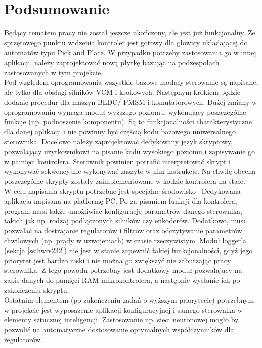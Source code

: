 \section*{Podsumowanie}

Będący tematem pracy \paperTitleSmallPl{} nie został jeszcze ukończony, ale jest już funkcjonalny. Ze sprzętowego punktu widzenia kontroler jest gotowy dla głowicy układającej do automatów typu Pick and Place. W przypadku potrzeby zastosowania go w innej aplikacji, należy zaprojektować nową płytkę bazując na podzespołach zastosowanych w tym projekcie. \\

Pod względem oprogramowania wszystkie bazowe moduły sterowanie są napisane, ale tylko dla obsługi silników VCM i krokowych. Następnym krokiem będzie dodanie procedur dla maszyn BLDC/ PMSM i komutatorowych. Dużej zmiany w oprogramowaniu wymaga moduł wyższego poziomu, wykonujący poszczególne funkcje (np. podnoszenie komponentu). Są to funkcjonalności charakterystyczne dla danej aplikacji i nie powinny być częścią kodu bazowego uniwersalnego sterownika. Docelowo należy zaprojektować dedykowany język skryptowy, pozwalający użytkownikowi na pisanie kodu wysokiego poziomu i zapisywanie go w pamięci kontrolera. Sterownik powinien potrafić interpretować skrypt i wykonywać sekwencyjnie wykonywać zaszyte w nim instrukcje. Na chwilę obecną poszczególne skrypty zostały zaimplementowane w kodzie kontrolera na stałe. \\

W celu napisania skryptu potrzebne jest specjalne środowisko-- Dedykowana aplikacja napisana na platformę PC. Po za pisaniem funkcji dla kontrolera, program musi także umożliwiać konfigurację parametrów danego sterownika, takich jak np. rodzaj podłączonych silników czy enkoderów. Dodatkowo, musi pozwalać na dostrajanie regulatorów i filtrów oraz odczytywanie parametrów chwilowych (np. prądy w uzwojeniach) w czasie rzeczywistym. Moduł logger'a (sekcja \ref{ss:hwrs232}) nie jest w stanie zapewnić takiej funkcjonalności, gdyż jego priorytet jest bardzo niski i nie można go zwiększyć nie zaburzając pracy sterownika. Z tego powodu potrzebny jest dodatkowy moduł pozwalający na zapis danych do pamięci RAM mikrokontrolera, a następnie wysłanie ich po zakończeniu skryptu. \\

Ostatnim elementem (po zakończeniu zadań o wyższym priorytecie) potrzebnym w projekcie jest wyposażenie aplikacji konfiguracyjnej i samego sterownika w elementy sztucznej inteligencji. Zastosowanie np. sieci neuronowej mogło by pozwolić na automatyczne dostosowanie optymalnych współczynników dla regulatorów.


\clearpage





